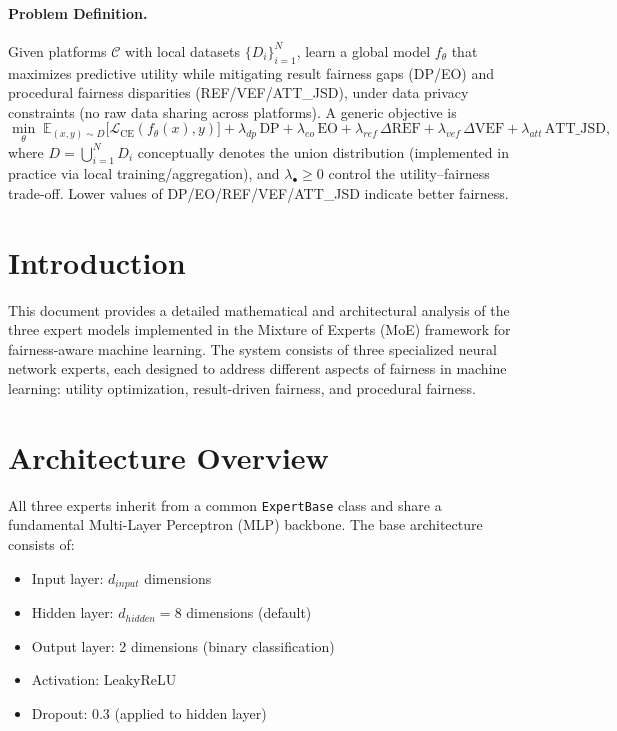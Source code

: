 \documentclass[11pt]{article}
\begin{document}
\paragraph{Problem Definition.} Given platforms $\mathcal{C}$ with local datasets $\{D_i\}_{i=1}^N$, learn a global model $f_\theta$ that maximizes predictive utility while mitigating result fairness gaps (DP/EO) and procedural fairness disparities (REF/VEF/ATT\_JSD), under data privacy constraints (no raw data sharing across platforms). A generic objective is
\begin{equation}
\label{eq:objective}
    \min_{\theta}\; \mathbb{E}_{(x,y)\sim D}\big[\mathcal{L}_{\text{CE}}(f_\theta(x), y)\big]
    + \lambda_{dp}\,\text{DP} + \lambda_{eo}\,\text{EO}
    + \lambda_{ref}\,\Delta\text{REF} + \lambda_{vef}\,\Delta\text{VEF} + \lambda_{att}\,\text{ATT\_JSD},
\end{equation}
where $D = \bigcup_{i=1}^N D_i$ conceptually denotes the union distribution (implemented in practice via local training/aggregation), and $\lambda_{\bullet} \ge 0$ control the utility–fairness trade-off. Lower values of DP/EO/REF/VEF/ATT\_JSD indicate better fairness.

\section{Introduction}

This document provides a detailed mathematical and architectural analysis of the three expert models implemented in the Mixture of Experts (MoE) framework for fairness-aware machine learning. The system consists of three specialized neural network experts, each designed to address different aspects of fairness in machine learning: utility optimization, result-driven fairness, and procedural fairness.

\section{Architecture Overview}

All three experts inherit from a common \texttt{ExpertBase} class and share a fundamental Multi-Layer Perceptron (MLP) backbone. The base architecture consists of:

\begin{itemize}
    \item Input layer: $d_{input}$ dimensions
    \item Hidden layer: $d_{hidden} = 8$ dimensions (default)
    \item Output layer: 2 dimensions (binary classification)
    \item Activation: LeakyReLU
    \item Dropout: 0.3 (applied to hidden layer)
\end{itemize}
\end{document}
